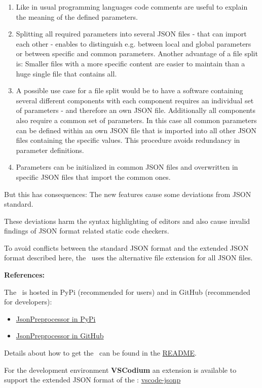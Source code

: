 \begin{enumerate}
   \item Like in usual programming languages code comments are useful to explain the meaning of the defined parameters.
   \item Splitting all required parameters into several JSON files - that can import each other - enables to distinguish e.g. between local and global parameters
         or between specific and common parameters. Another advantage of a file split is: Smaller files with a more specific content are easier to maintain than
         a huge single file that contains all.
   \item A possible use case for a file split would be to have a software containing several different components with each component requires an individual set of
         parameters - and therefore an own JSON file. Additionally all components also require a common set of parameters. In this case all common parameters can be defined
         within an own JSON file that is imported into all other JSON files containing the specific values. This procedure avoids redundancy in parameter definitions.
   \item Parameters can be initialized in common JSON files and overwritten in specific JSON files that import the common ones.
\end{enumerate}

But this has consequences: The new features cause some deviations from JSON standard. 

These deviations harm the syntax highlighting of editors and also cause invalid findings of JSON format related static code checkers.

To avoid conflicts between the standard JSON format and the extended JSON format described here, the \pkg\ uses the alternative file extension
 for all JSON files.

\newpage

\textbf{References:}

The \pkg\ is hosted in PyPi (recommended for users) and in GitHub (recommended for developers):

\begin{itemize}
   \item \href{https://pypi.org/project/JsonPreprocessor/}{JsonPreprocessor in PyPi}
   \item \href{https://github.com/test-fullautomation/python-jsonpreprocessor}{JsonPreprocessor in GitHub}
\end{itemize}

Details about how to get the \pkg\ can be found in the
\href{https://github.com/test-fullautomation/python-jsonpreprocessor/blob/develop/README.rst}{README}.

For the development environment \textbf{VSCodium} an extension is available to support the extended JSON format of the \pkg:
\href{https://github.com/test-fullautomation/vscode-jsonp}{vscode-jsonp}

